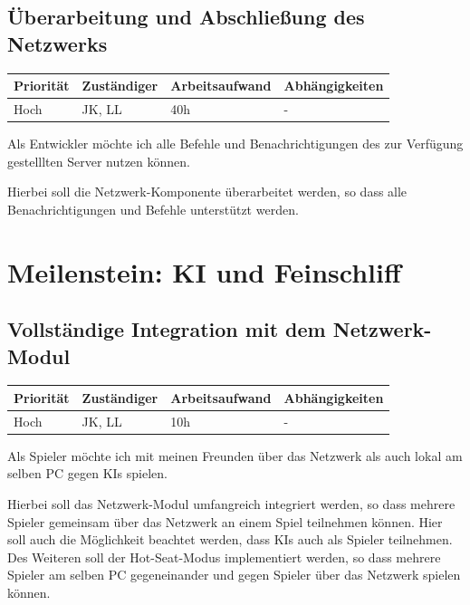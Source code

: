\documentclass[a4paper]{scrreprt}
\newenvironment{requirement}[5] {
	\subsection{#1}
	\begin{tabularx}{\textwidth}{|X|l|X|X|}
		\hline
		Priorität & Zuständiger & Arbeitsaufwand & Abhängigkeiten \\
		\hline
		#2 & #3 & #4 & #5 \\
		\hline
	\end{tabularx}
	}{
	\newpage
	}
\begin{document}
\begin{requirement}{Überarbeitung und Abschließung des Netzwerks}{Hoch}{JK, LL}{40h}{-}

\begin{center}
	Als Entwickler möchte ich alle Befehle und Benachrichtigungen des zur Verfügung gestelllten Server nutzen können.
\end{center}

Hierbei soll die Netzwerk-Komponente überarbeitet werden, so dass alle Benachrichtigungen und Befehle unterstützt werden.

\end{requirement}


\section{Meilenstein: KI und Feinschliff}


\begin{requirement}{Vollständige Integration mit dem Netzwerk-Modul}{Hoch}{JK, LL}{10h}{-}

\begin{center}
	Als Spieler möchte ich mit meinen Freunden über das Netzwerk als auch lokal am selben PC gegen KIs spielen.
\end{center}

Hierbei soll das Netzwerk-Modul umfangreich integriert werden, so dass mehrere Spieler gemeinsam über das Netzwerk an einem Spiel teilnehmen können. Hier soll auch die Möglichkeit beachtet werden, dass KIs auch als Spieler teilnehmen. Des Weiteren soll der Hot-Seat-Modus implementiert werden, so dass mehrere Spieler am selben PC gegeneinander und gegen Spieler über das Netzwerk spielen können.

\end{requirement}
\end{document}
